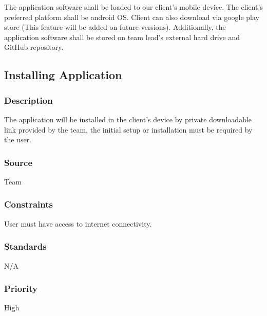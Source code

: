 The application software shall be loaded to our client's mobile device. The client's preferred platform shall be android OS. Client can also download via google play store (This feature will be added on future versions). Additionally, the application software shall be stored on team lead's external hard drive and GitHub repository.  

\subsection{Installing Application}
\subsubsection{Description}
The application will be installed in the client's device by private downloadable link provided by the team, the initial setup or installation must be required by the user.   
\subsubsection{Source}
Team
\subsubsection{Constraints}
User must have access to internet connectivity. 
\subsubsection{Standards}
N/A
\subsubsection{Priority}
High